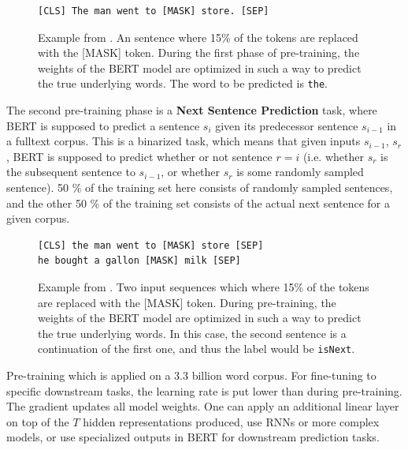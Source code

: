 \documentclass[a4paper,12pt,oneside,openright]{report}
\begin{document}
\begin{tcolorbox}
\begin{figure}[H]
\begin{verbatim}
[CLS] The man went to [MASK] store. [SEP]
\end{verbatim}
Example from \cite{devlin18}. 
An sentence where 15\% of the tokens are replaced with the [MASK] token. 
During the first phase of pre-training, the weights of the BERT model are optimized in such a way to predict the true underlying words.
The word to be predicted is \texttt{the}.
\end{figure}
\end{tcolorbox}

The second pre-training phase is a \textbf{Next Sentence Prediction} task, where BERT is supposed to predict a sentence $s_i$ given its predecessor sentence $s_{i-1}$ in a fulltext corpus.
This is a binarized task, which means that given inputs $s_{i-1}$, $s_r$, BERT is supposed to predict whether or not sentence $r = i$ (i.e. whether $s_r$ is the subsequent sentence to $s_{i-1}$, or whether $s_r$ is some randomly sampled sentence).
50 \% of the training set here consists of randomly sampled sentences, and the other 50 \% of the training set consists of the actual next sentence for a given corpus.

\begin{tcolorbox}
\begin{figure}[H]
\begin{verbatim}
[CLS] the man went to [MASK] store [SEP]
he bought a gallon [MASK] milk [SEP]
\end{verbatim}
Example from \cite{devlin18}. 
Two input sequences which where 15\% of the tokens are replaced with the [MASK] token. 
During pre-training, the weights of the BERT model are optimized in such a way to predict the true underlying words.
In this case, the second sentence is a continuation of the first one, and thus the label would be \texttt{isNext}.
\end{figure}
\end{tcolorbox}

Pre-training which is applied on a 3.3 billion word corpus.
For fine-tuning to specific downstream tasks, the learning rate is put lower than during pre-training.
The gradient updates all model weights.
One can apply an additional linear layer on top of the $T$ hidden representations produced, use RNNs or more complex models, or use specialized outputs in BERT for downstream prediction tasks.
\end{document}
